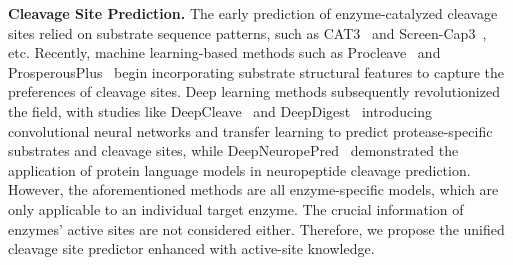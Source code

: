 \textbf{Cleavage Site Prediction.}
The early prediction of enzyme-catalyzed cleavage sites relied on substrate sequence patterns, such as CAT3~\cite{CAT3} and Screen-Cap3~\cite{ScreenCap3}, etc. Recently, machine learning-based methods such as Procleave~\cite{procleave} and ProsperousPlus~\cite{ProsperousPlus} begin incorporating substrate structural features to capture the preferences of cleavage sites. Deep learning methods subsequently revolutionized the field, with studies like DeepCleave~\cite{DeepCleave} and DeepDigest~\cite{yang2021deepdigest} introducing convolutional neural networks and transfer learning to predict protease-specific substrates and cleavage sites, while DeepNeuropePred~\cite{WANG2024309} demonstrated the application of protein language models in neuropeptide cleavage prediction. 
However, the aforementioned methods are all enzyme-specific models, which are only applicable to an individual target enzyme. The crucial information of enzymes' active sites are not considered either. Therefore, we propose the unified cleavage site predictor enhanced with active-site knowledge.









